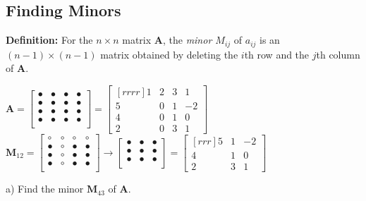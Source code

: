 \documentclass{article}
\begin{document}
\begin{flushleft}
\newpage


\section{Finding Minors}


\textbf{Definition:} For the $n \times n$ matrix \textbf{A}, the \textit{minor $M_{ij}$} of $a_{ij}$ is an $(n-1) \times (n-1)$ matrix obtained by deleting the $i$th row and the $j$th column of \textbf{A}.

\begin{center}
$\textbf{A}=
\begin{bmatrix}
\bullet &\bullet &\bullet & \bullet \\
\bullet &\bullet &\bullet & \bullet \\
\bullet &\bullet &\bullet & \bullet \\
\bullet &\bullet &\bullet & \bullet \\
\end{bmatrix}
=
\begin{bmatrix}[rrrr]
1&2&3&1\\
5&0&1&-2\\
4&0&1&0\\
2&0&3&1
\end{bmatrix}
$
\hspace{0.4in}
$\textbf{M}_{12}=
\begin{bmatrix}
\circ & \circ & \circ & \circ \\
\bullet & \circ & \bullet & \bullet \\
\bullet & \circ & \bullet & \bullet \\
\bullet & \circ & \bullet & \bullet \\
\end{bmatrix}
\rightarrow
\begin{bmatrix}
\bullet & \bullet & \bullet \\
\bullet & \bullet & \bullet \\
\bullet & \bullet & \bullet \\
\end{bmatrix}
=
\begin{bmatrix}[rrr]
5 & 1&-2\\
4 & 1& 0\\
2&3&1
\end{bmatrix}$
\end{center}

a) Find the minor $\textbf{M}_{43}$ of $\textbf{A}$.

\vspace{1.25in}


\end{flushleft}
\end{document}
